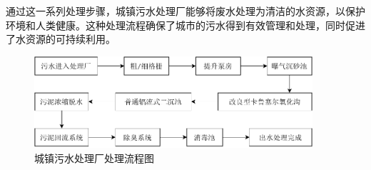 通过这一系列处理步骤，城镇污水处理厂能够将废水处理为清洁的水资源，以保护环境和人类健康。这种处理流程确保了城市的污水得到有效管理和处理，同时促进了水资源的可持续利用。

\begin{figure}[H]
	\centering
	\includegraphics[width=0.92\textwidth]{figures/flowchart.drawio.pdf}


	\caption{城镇污水处理厂处理流程图}
	\label{fig:flowchart}
\end{figure}

